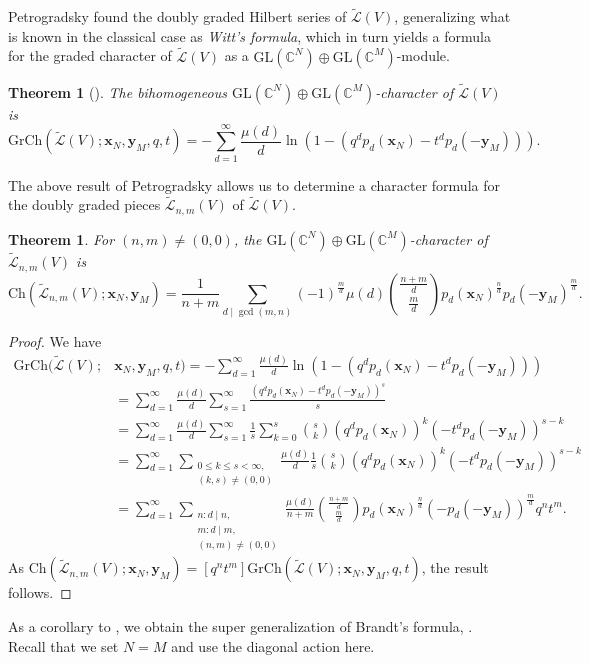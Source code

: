 \documentclass[11pt]{article}
\newtheorem{thm}[theo]{Theorem}
\theoremstyle{definition}
\numberwithin{equation}{section}
\newcommand\CC{\mathbb{C}}
\newcommand\ch{\Ch}
\newcommand\GL{\mathrm{GL}}
\newcommand\grch{\mathrm{GrCh}}
\newcommand\xb{\mathbf{x}}
\newcommand\yb{\mathbf{y}}
\newcommand\Ltil{\widetilde{\mathcal{L}}}
\newcommand\Ch{\mathrm{Ch}}
\begin{document}
Petrogradsky \cite{Pet} found the doubly graded Hilbert series of $\Ltil(V)$, generalizing what is known in the classical case as \emph{Witt's formula}, which in turn yields a formula for the graded character of $\Ltil(V)$ as a $\GL(\CC^N) \oplus \GL(\CC^M)$-module.
\begin{thm}[\cite{Pet}]\label{thm:free-super-lie-char}
    The bihomogeneous $\GL(\CC^N) \oplus \GL(\CC^M)$-character of $\Ltil(V)$ is
    \[
    \grch(\Ltil(V);\xb_N,\yb_M,q,t) = -\sum_{d=1}^\infty \frac{\mu(d)}{d} \ln(1-(q^dp_d(\xb_N) - t^dp_d(-\yb_M))).
    \]
\end{thm}
The above result of Petrogradsky allows us to determine a character formula for the doubly graded pieces $\Ltil_{n,m}(V)$ of $\Ltil(V)$.
\begin{thm}\label{thm:super-bi-brandt}
    For $(n,m) \neq (0,0)$, the $\GL(\CC^N) \oplus \GL(\CC^M)$-character of $\Ltil_{n,m}(V)$ is
    \[
    \ch(\Ltil_{n,m}(V);\xb_N,\yb_M) = \frac{1}{n+m} \sum_{d \mid \gcd(m,n)} (-1)^\frac{m}{d} \mu(d) \binom{\frac{n+m}{d}}{\frac{m}{d}} p_d(\xb_N)^\frac{n}{d}p_d(-\yb_M)^\frac{m}{d}.
    \]
\end{thm}
\begin{proof}
    We have
    \begin{align*}
    \grch(\Ltil(V);&\xb_N,\yb_M,q,t) = -\sum_{d=1}^\infty \frac{\mu(d)}{d} \ln(1-(q^dp_d(\xb_N) - t^dp_d(-\yb_M))) \\
    &= \sum_{d=1}^\infty \frac{\mu(d)}{d} \sum_{s=1}^\infty \frac{(q^dp_d(\xb_N) - t^dp_d(-\yb_M))^s}{s} \\
    &= \sum_{d=1}^\infty \frac{\mu(d)}{d} \sum_{s=1}^\infty \frac{1}{s} \sum_{k=0}^s {\binom{s}{k}}(q^dp_d(\xb_N))^k(-t^dp_d(-\yb_M))^{s-k} \\
    &= \sum_{d=1}^\infty \sum_{\substack{0 \le k \le s < \infty, \\ (k,s) \neq (0,0)}} \frac{\mu(d)}{d} \frac{1}{s} {\binom{s}{k}} (q^dp_d(\xb_N))^k(-t^dp_d(-\yb_M))^{s-k} \\
    &= \sum_{d=1}^\infty \sum_{\substack{n : d \mid n, \\ m : d \mid m, \\ (n,m) \neq (0,0)}} \frac{\mu(d)}{n+m} \binom{\frac{n+m}{d}}{\frac{m}{d}} p_d(\xb_N)^\frac{n}{d}(-p_d(-\yb_M))^\frac{m}{d} q^nt^m.
    \end{align*}
    As $\ch(\Ltil_{n,m}(V);\xb_N,\yb_M) = [q^nt^m]\grch(\Ltil(V);\xb_N,\yb_M,q,t)$, the result follows.
\end{proof}
As a corollary to , we obtain the super generalization of Brandt's formula, . Recall that we set $N=M$ and use the diagonal action here.
\end{document}

